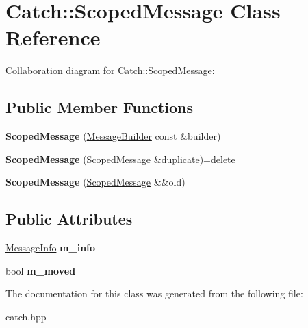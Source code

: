 \hypertarget{classCatch_1_1ScopedMessage}{}\section{Catch\+:\+:Scoped\+Message Class Reference}
\label{classCatch_1_1ScopedMessage}


Collaboration diagram for Catch\+:\+:Scoped\+Message\+:
\subsection*{Public Member Functions}
\begin{DoxyCompactItemize}
\item 
\mbox{\label{classCatch_1_1ScopedMessage_a5cc59f0f2ebe840e6607f83004d49a17}} 
{\bfseries Scoped\+Message} (\hyperlink{structCatch_1_1MessageBuilder}{Message\+Builder} const \&builder)
\item 
\mbox{\label{classCatch_1_1ScopedMessage_a5fe2e79afdfd737818c15edfc49f378e}} 
{\bfseries Scoped\+Message} (\hyperlink{classCatch_1_1ScopedMessage}{Scoped\+Message} \&duplicate)=delete
\item 
\mbox{\label{classCatch_1_1ScopedMessage_aac833a6a2245a26e6bd5c9252ca1caa0}} 
{\bfseries Scoped\+Message} (\hyperlink{classCatch_1_1ScopedMessage}{Scoped\+Message} \&\&old)
\end{DoxyCompactItemize}
\subsection*{Public Attributes}
\begin{DoxyCompactItemize}
\item 
\mbox{\label{classCatch_1_1ScopedMessage_ae6e1476f389cc6e1586f033b3747b27b}} 
\hyperlink{structCatch_1_1MessageInfo}{Message\+Info} {\bfseries m\+\_\+info}
\item 
\mbox{\label{classCatch_1_1ScopedMessage_a4fe5607c1f7407240a0da8405b1c12e7}} 
bool {\bfseries m\+\_\+moved}
\end{DoxyCompactItemize}


The documentation for this class was generated from the following file\+:\begin{DoxyCompactItemize}
\item 
catch.\+hpp\end{DoxyCompactItemize}
